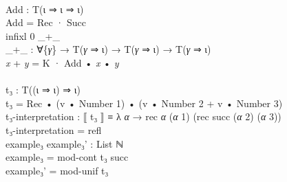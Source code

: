 \documentclass{entcs} \usepackage{prentcsmacro}
\newcommand{\AgdaFontStyle}[1]{\textsf{#1}}
\newcommand{\AgdaBoundFontStyle}[1]{\textit{#1}}
\newcommand{\AgdaKeyword}     [1]
    {\AgdaFontStyle{\textcolor{AgdaKeyword}{#1}}}
\newcommand{\AgdaNumber}      [1]{\textcolor{AgdaNumber}{#1}}
\newcommand{\AgdaSymbol}      [1]{\textcolor{AgdaSymbol}{#1}}
\newcommand{\AgdaBound}    [1]{\AgdaBoundFontStyle{\textcolor{AgdaBound}{#1}}}
\newcommand{\AgdaInductiveConstructor}[1]
    {\AgdaFontStyle{\textcolor{AgdaInductiveConstructor}{#1}}}
\newcommand{\AgdaDatatype} [1]{\AgdaFontStyle{\textcolor{AgdaDatatype}{#1}}}
\newcommand{\AgdaFunction} [1]{\AgdaFontStyle{\textcolor{AgdaFunction}{#1}}}
\newcommand{\AgdaCodeStyle}{\small}
\newenvironment{code}%
{\noindent\AgdaCodeStyle\pboxed}%
{\endpboxed\par\noindent%
\ignorespacesafterend}
\begin{document}
\begin{code}\>\<%
\\
\>\AgdaFunction{Add} \AgdaSymbol{:} \AgdaDatatype{T}\AgdaSymbol{(}\AgdaInductiveConstructor{ι} \AgdaInductiveConstructor{⇒} \AgdaInductiveConstructor{ι} \AgdaInductiveConstructor{⇒} \AgdaInductiveConstructor{ι}\AgdaSymbol{)}\<%
\\
\>\AgdaFunction{Add} \AgdaSymbol{=} \AgdaInductiveConstructor{Rec} \AgdaInductiveConstructor{·} \AgdaInductiveConstructor{Succ}\<%
\\
\>\AgdaKeyword{infixl} \AgdaNumber{0} \_+\_\<%
\\
\>\AgdaFunction{\_+\_} \AgdaSymbol{:} \AgdaSymbol{∀\{}\AgdaBound{γ}\AgdaSymbol{\}} \AgdaSymbol{→} \AgdaDatatype{T}\AgdaSymbol{(}\AgdaBound{γ} \AgdaInductiveConstructor{⇒} \AgdaInductiveConstructor{ι}\AgdaSymbol{)} \AgdaSymbol{→} \AgdaDatatype{T}\AgdaSymbol{(}\AgdaBound{γ} \AgdaInductiveConstructor{⇒} \AgdaInductiveConstructor{ι}\AgdaSymbol{)} \AgdaSymbol{→} \AgdaDatatype{T}\AgdaSymbol{(}\AgdaBound{γ} \AgdaInductiveConstructor{⇒} \AgdaInductiveConstructor{ι}\AgdaSymbol{)}\<%
\\
\>\AgdaBound{x} \AgdaFunction{+} \AgdaBound{y} \AgdaSymbol{=} \AgdaInductiveConstructor{K} \AgdaInductiveConstructor{·} \AgdaFunction{Add} \AgdaFunction{•} \AgdaBound{x} \AgdaFunction{•} \AgdaBound{y}\<%
\\
%
\\
\>\AgdaFunction{t₃} \AgdaSymbol{:} \AgdaDatatype{T}\AgdaSymbol{((}\AgdaInductiveConstructor{ι} \AgdaInductiveConstructor{⇒} \AgdaInductiveConstructor{ι}\AgdaSymbol{)} \AgdaInductiveConstructor{⇒} \AgdaInductiveConstructor{ι}\AgdaSymbol{)}\<%
\\
\>\AgdaFunction{t₃} \AgdaSymbol{=} \AgdaInductiveConstructor{Rec} \AgdaFunction{•} \AgdaSymbol{(}\AgdaFunction{v} \AgdaFunction{•} \AgdaFunction{Number} \AgdaNumber{1}\AgdaSymbol{)} \AgdaFunction{•} \AgdaSymbol{(}\AgdaFunction{v} \AgdaFunction{•} \AgdaFunction{Number} \AgdaNumber{2} \AgdaFunction{+} \AgdaFunction{v} \AgdaFunction{•} \AgdaFunction{Number} \AgdaNumber{3}\AgdaSymbol{)}\<%
\\
\>\AgdaFunction{t₃-interpretation} \AgdaSymbol{:} \AgdaFunction{⟦} \AgdaFunction{t₃} \AgdaFunction{⟧} \AgdaDatatype{≡} \AgdaSymbol{λ} \AgdaBound{α} \AgdaSymbol{→} \AgdaFunction{rec} \AgdaBound{α} \AgdaSymbol{(}\AgdaBound{α} \AgdaNumber{1}\AgdaSymbol{)} \AgdaSymbol{(}\AgdaFunction{rec} \AgdaInductiveConstructor{succ} \AgdaSymbol{(}\AgdaBound{α} \AgdaNumber{2}\AgdaSymbol{)} \AgdaSymbol{(}\AgdaBound{α} \AgdaNumber{3}\AgdaSymbol{))}\<%
\\
\>\AgdaFunction{t₃-interpretation} \AgdaSymbol{=} \AgdaInductiveConstructor{refl}\<%
\\
\>\AgdaFunction{example₃} \AgdaFunction{example₃'} \AgdaSymbol{:} \AgdaDatatype{List} \AgdaDatatype{ℕ}\<%
\\
\>\AgdaFunction{example₃} \AgdaSymbol{=} \AgdaFunction{mod-cont} \AgdaFunction{t₃} \AgdaInductiveConstructor{succ}\<%
\\
\>\AgdaFunction{example₃'} \AgdaSymbol{=} \AgdaFunction{mod-unif} \AgdaFunction{t₃}\<%
\\
\>\<\end{code}
\end{document}
